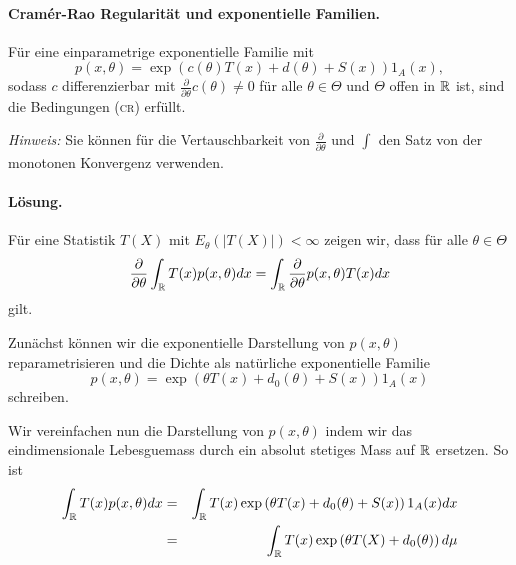 \paragraph{Cram\'er-Rao Regularität und exponentielle Familien. }
Für eine einparametrige exponentielle Familie mit
\begin{equation*}
	p(x, \theta) = \exp \left( c(\theta) T(x) + d(\theta) +S(x) \right)1_A(x),
\end{equation*}
sodass $c$ differenzierbar mit $\frac{\partial}{\partial \theta} c(\theta)\neq 0$ 
für alle $\theta\in \Theta$ und $\Theta$ offen in $\mathbb R$ ist, sind die Bedingungen (\textsc{cr})
erfüllt.

\emph{Hinweis:} Sie können für die Vertauschbarkeit von $\frac{\partial}{\partial \theta}$ und $\int_{}^{}$
den Satz von der monotonen Konvergenz verwenden. 

\paragraph*{Lösung. }
Für eine Statistik $T(X)$ mit $E_\theta (|T(X)|) < \infty$ zeigen wir, dass für alle $\theta\in\Theta$
\begin{equation}
	\frac{\partial}{\partial \theta} \int_{\mathbb R}^{} T(x) p(x,\theta) dx = 
	\int_{\mathbb R}^{} \frac{\partial}{\partial \theta} p(x,\theta) T(x) dx
	\label{main-interchange}
\end{equation}
gilt.

Zunächst können wir die exponentielle Darstellung von $p(x,\theta)$
reparametrisieren und die Dichte als natürliche exponentielle Familie 
\begin{equation}
	p(x,\theta) = \exp \left( \theta T(x) + d_0(\theta) + S(x) \right)1_A(x)
\end{equation}
schreiben.

Wir vereinfachen nun die Darstellung von $p(x,\theta)$ indem wir das eindimensionale
Lebesguemass durch ein absolut stetiges Mass auf $\mathbb R$ ersetzen. So ist 
\begin{eqnarray}
	\int_{\mathbb R}^{} T(x) p(x,\theta) dx &=& 
	\int_{\mathbb R}^{} T(x) \exp \left( \theta T(x) + d_0(\theta) + S(x) \right)1_A(x) dx \\
	&=& \int_{\mathbb R}^{} T(x) \exp \left( \theta T(X) + d_0(\theta) \right) d\mu 
\end{eqnarray}

